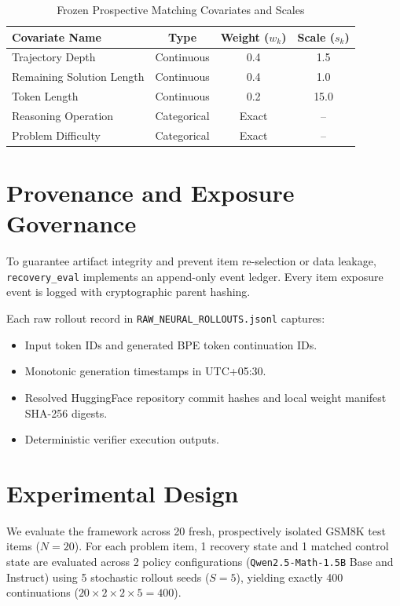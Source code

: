 \documentclass[10pt,conference,letterpaper]{IEEEtran}
\begin{document}
\begin{table}[htbp]
\begin{table}[htbp]
\caption{Frozen Prospective Matching Covariates and Scales}
\label{tab:covariates}
\centering
\begin{tabular}{lccc}
\toprule
\textbf{Covariate Name} & \textbf{Type} & \textbf{Weight ($w_k$)} & \textbf{Scale ($s_k$)} \\
\midrule
Trajectory Depth & Continuous & 0.4 & 1.5 \\
Remaining Solution Length & Continuous & 0.4 & 1.0 \\
Token Length & Continuous & 0.2 & 15.0 \\
Reasoning Operation & Categorical & Exact & -- \\
Problem Difficulty & Categorical & Exact & -- \\
\bottomrule
\end{tabular}
\end{table}

\section{Provenance and Exposure Governance}
To guarantee artifact integrity and prevent item re-selection or data leakage, \texttt{recovery\_eval} implements an append-only event ledger. Every item exposure event is logged with cryptographic parent hashing.

Each raw rollout record in \texttt{RAW\_NEURAL\_ROLLOUTS.jsonl} captures:
\begin{itemize}
    \item Input token IDs and generated BPE token continuation IDs.
    \item Monotonic generation timestamps in UTC+05:30.
    \item Resolved HuggingFace repository commit hashes and local weight manifest SHA-256 digests.
    \item Deterministic verifier execution outputs.
\end{itemize}

\section{Experimental Design}
We evaluate the framework across 20 fresh, prospectively isolated GSM8K test items ($N=20$). For each problem item, 1 recovery state and 1 matched control state are evaluated across 2 policy configurations (\texttt{Qwen2.5-Math-1.5B} Base and Instruct) using 5 stochastic rollout seeds ($S=5$), yielding exactly 400 continuations ($20 \times 2 \times 2 \times 5 = 400$).


\end{table}
\end{document}
